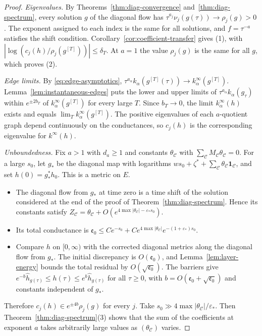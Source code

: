 \begin{proof}
\emph{Eigenvalues.} By Theorems~\ref{thm:diag-convergence}
and~\ref{thm:diag-spectrum}, every solution $g$ of the diagonal flow has
$\tau^{a_j}\nu_j(g(\tau))\to\rho_j(g)>0$. The exponent assigned to each
index is the same for all solutions, and $f=\tau^{-a}$ satisfies the shift
condition. Corollary~\ref{cor:coefficient-transfer} gives (1), with
$|\log(c_j(h)/\rho_j(g^{[T]}))|\le\delta_T$. At $a=1$ the value
$\rho_j(g)$ is the same for all $g$, which proves (2).

\emph{Edge limits.} By \eqref{eq:edge-asymptotics},
$\tau^{a_\alpha}k_\alpha(g^{[T]}(\tau))\to k^\infty_\alpha(g^{[T]})$.
Lemma~\ref{lem:instantaneous-edges} puts the lower and upper limits of
$\tau^{a_\alpha}k_\alpha(g_\tau)$ within $e^{\pm2b_T}$ of
$k^\infty_\alpha(g^{[T]})$ for every large $T$. Since $b_T\to0$, the limit
$k^\infty_\alpha(h)$ exists and equals $\lim_Tk^\infty_\alpha(g^{[T]})$. The
positive eigenvalues of each $a$-quotient graph depend continuously on the
conductances, so $c_j(h)$ is the corresponding eigenvalue for $k^\infty(h)$.

\emph{Unboundedness.} Fix $a>1$ with $d_a\ge1$ and constants $\theta_{\mathcal C}$ with
$\sum_{\mathcal C}M_{\mathcal C}\theta_{\mathcal C}=0$. For a large $s_0$, let $g_*$ be the diagonal map with
logarithms $w s_0+\zeta^*+\sum_{\mathcal C}\theta_{\mathcal C}\mathbf 1_{\mathcal C}$, and set
$h(0)=g_*^*h_0$. This is a metric on $E$.
\begin{itemize}
\item The diagonal flow from $g_*$ at time zero is a time shift of the
 solution considered at the end of the proof of
 Theorem~\ref{thm:diag-spectrum}. Hence its constants satisfy
 $Z_{\mathcal C}=\theta_{\mathcal C}+O(e^{4\max|\theta_{\mathcal C}|-\varepsilon_*s_0})$.
\item Its total conductance is
 $\mathfrak e_0\le Ce^{-s_0}+Ce^{4\max|\theta_{\mathcal C}|}e^{-(1+\varepsilon_*)s_0}$.
\item Compare $h$ on $[0,\infty)$ with the corrected diagonal metrics along
 the diagonal flow from $g_*$. The initial discrepancy is $O(\mathfrak e_0)$,
 and Lemma~\ref{lem:layer-energy} bounds the total residual by
 $O(\sqrt{\mathfrak e_0})$. The barriers give
 $e^{-b}\widehat h_{g(\tau)}\le h(\tau)\le e^b\widehat h_{g(\tau)}$ for
 all $\tau\ge0$, with $b=O(\mathfrak e_0+\sqrt{\mathfrak e_0})$ and constants independent of
 $g_*$.
\end{itemize}
Therefore $c_j(h)\in e^{\pm4b}\rho_j(g)$ for every $j$. Take
$s_0\gg4\max|\theta_{\mathcal C}|/\varepsilon_*$. Then
Theorem~\ref{thm:diag-spectrum}(3) shows that the sum of the coefficients
at exponent $a$ takes arbitrarily large values as $(\theta_{\mathcal C})$ varies.


\end{proof}
